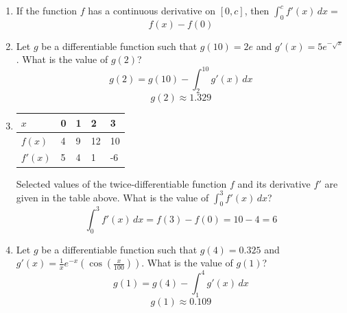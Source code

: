 \documentclass[12pt]{article}
\begin{document}
\begin{enumerate}
\item If the function $f$ has a continuous derivative on $[0,c]$, then $\int_{0}^{c} f'(x) \,dx=$
$$\boxed{f(x)-f(0)}$$
\item Let $g$ be a differentiable function such that $g(10)=2e$ and $g'(x)=5e^{-\sqrt{x}}$. What is the value of $g(2)$?
$$g(2)=g(10)-\int_{2}^{10} g'(x) \, dx$$
$$\boxed{g(2)\approx 1.329}$$
\item 
\begin{table}[h]
\centering
\begin{tabular}{|l||l|l|l|l|}
\hline
$x$ & 0 & 1 & 2 & 3 \\ \hline\hline
$f(x)$ & 4 & 9 & 12 & 10 \\ \hline
$f'(x)$ & 5 & 4 & 1 & -6 \\ \hline
\end{tabular}
\end{table}
Selected values of the twice-differentiable function $f$ and its derivative $f'$ are given in the table above. What is the value of $\int_{0}^{3} f'(x) \, dx$?
$$\int_{0}^{3} f'(x) \, dx = f(3)-f(0)=10-4= \boxed{6}$$

\item Let $g$ be a differentiable function such that $g(4)=0.325$ and $g'(x)=\frac{1}{x}e^{-x}(\cos(\frac{x}{100}))$. What is the value of $g(1)$?
$$g(1)=g(4)-\int_{1}^{4}g'(x) \, dx $$
$$\boxed{g(1)\approx 0.109}$$


\end{enumerate}
\end{document}
